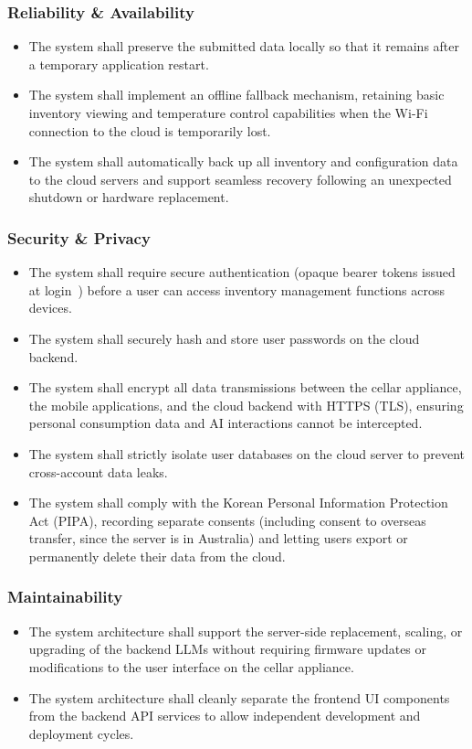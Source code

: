 \documentclass[conference]{IEEEtran}
\begin{document}
\subsubsection{Reliability \& Availability}
\begin{itemize}
    \item The system shall preserve the submitted data locally so that it remains after a temporary application restart.
    \item The system shall implement an offline fallback mechanism, retaining basic inventory viewing and temperature control capabilities when the Wi-Fi connection to the cloud is temporarily lost.
    \item The system shall automatically back up all inventory and configuration data to the cloud servers and support seamless recovery following an unexpected shutdown or hardware replacement.
\end{itemize}

\subsubsection{Security \& Privacy}
\begin{itemize}
    \item The system shall require secure authentication (opaque bearer tokens issued at login~\cite{bearer}) before a user can access inventory management functions across devices.
    \item The system shall securely hash and store user passwords on the cloud backend.
    \item The system shall encrypt all data transmissions between the cellar appliance, the mobile applications, and the cloud backend with HTTPS (TLS), ensuring personal consumption data and AI interactions cannot be intercepted.
    \item The system shall strictly isolate user databases on the cloud server to prevent cross-account data leaks.
    \item The system shall comply with the Korean Personal Information Protection Act (PIPA), recording separate consents (including consent to overseas transfer, since the server is in Australia) and letting users export or permanently delete their data from the cloud.
\end{itemize}

\subsubsection{Maintainability}
\begin{itemize}
    \item The system architecture shall support the server-side replacement, scaling, or upgrading of the backend LLMs without requiring firmware updates or modifications to the user interface on the cellar appliance.
    \item The system architecture shall cleanly separate the frontend UI components from the backend API services to allow independent development and deployment cycles.
\end{itemize}
\end{document}

